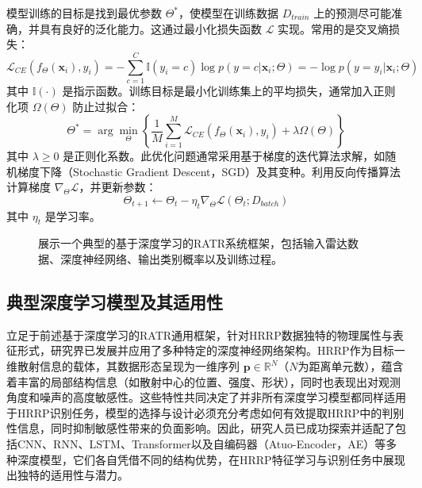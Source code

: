 模型训练的目标是找到最优参数 $\Theta^*$，使模型在训练数据 $D_{train}$ 上的预测尽可能准确，并具有良好的泛化能力。这通过最小化损失函数 $\mathcal{L}$ 实现。常用的是交叉熵损失：
\begin{equation}
    \mathcal{L}_{CE}(f_\Theta(\mathbf{x}_i), y_i) = -\sum_{c=1}^{C} \mathbb{I}(y_i=c) \log p(y=c|\mathbf{x}_i; \Theta) = -\log p(y=y_i|\mathbf{x}_i; \Theta)
    \label{eq:cross_entropy_loss}
\end{equation}
其中 $\mathbb{I}(\cdot)$ 是指示函数。训练目标是最小化训练集上的平均损失，通常加入正则化项 $\Omega(\Theta)$ 防止过拟合：
\begin{equation}
    \Theta^* = \arg\min_{\Theta} \left\{ \frac{1}{M} \sum_{i=1}^{M} \mathcal{L}_{CE}(f_\Theta(\mathbf{x}_i), y_i) + \lambda \Omega(\Theta) \right\}
    \label{eq:optimization_objective}
\end{equation}
其中 $\lambda \ge 0$ 是正则化系数。此优化问题通常采用基于梯度的迭代算法求解，如随机梯度下降（Stochastic Gradient Descent，SGD）及其变种。利用反向传播算法计算梯度 $\nabla_\Theta \mathcal{L}$，并更新参数：
\begin{equation}
    \Theta_{t+1} \leftarrow \Theta_t - \eta_t \nabla_\Theta \mathcal{L}(\Theta_t; D_{batch})
    \label{eq:sgd_update}
\end{equation}
其中 $\eta_t$ 是学习率。

\begin{figure}[h!]
    \centering
    \caption{展示一个典型的基于深度学习的RATR系统框架，包括输入雷达数据、深度神经网络、输出类别概率以及训练过程。}
    \label{fig:深度学习_framework}
\end{figure}

\subsection{典型深度学习模型及其适用性}
\label{subsec:typical_深度学习_models}

立足于前述基于深度学习的RATR通用框架，针对HRRP数据独特的物理属性与表征形式，研究界已发展并应用了多种特定的深度神经网络架构。HRRP作为目标一维散射信息的载体，其数据形态呈现为一维序列 $\mathbf{p} \in \mathbb{R}^N$（$N$为距离单元数），蕴含着丰富的局部结构信息（如散射中心的位置、强度、形状），同时也表现出对观测角度和噪声的高度敏感性。这些特性共同决定了并非所有深度学习模型都同样适用于HRRP识别任务，模型的选择与设计必须充分考虑如何有效提取HRRP中的判别性信息，同时抑制敏感性带来的负面影响。因此，研究人员已成功探索并适配了包括CNN、RNN、LSTM、Transformer以及自编码器（Atuo-Encoder，AE）等多种深度模型，它们各自凭借不同的结构优势，在HRRP特征学习与识别任务中展现出独特的适用性与潜力。

